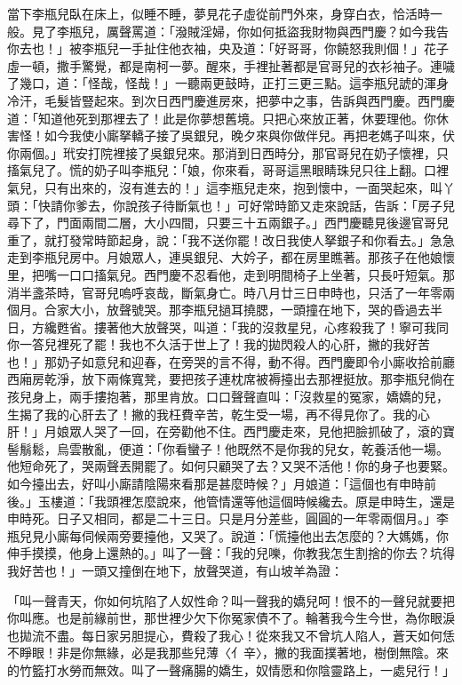 當下李瓶兒臥在床上，似睡不睡，夢見花子虛從前門外來，身穿白衣，恰活時一般。見了李瓶兒，厲聲罵道：「潑賊淫婦，你如何抵盜我財物與西門慶？如今我告你去也！」被李瓶兒一手扯住他衣袖，央及道：「好哥哥，你饒怒我則個！」花子虛一頓，撒手驚覺，都是南柯一夢。醒來，手裡扯著都是官哥兒的衣衫袖子。連噦了幾口，道：「怪哉，怪哉！」一聽兩更鼓時，正打三更三點。這李瓶兒諕的渾身冷汗，毛髮皆豎起來。到次日西門慶進房來，把夢中之事，告訴與西門慶。西門慶道：「知道他死到那裡去了！此是你夢想舊境。只把心來放正著，休要理他。你休害怪！如今我使小廝拏轎子接了吳銀兒，晚夕來與你做伴兒。再把老媽子叫來，伏你兩個。」玳安打院裡接了吳銀兒來。那消到日西時分，那官哥兒在奶子懷裡，只搐氣兒了。慌的奶子叫李瓶兒：「娘，你來看，哥哥這黑眼睛珠兒只往上翻。口裡氣兒，只有出來的，沒有進去的！」這李瓶兒走來，抱到懷中，一面哭起來，叫丫頭：「快請你爹去，你說孩子待斷氣也！」可好常時節又走來說話，告訴：「房子兒尋下了，門面兩間二層，大小四間，只要三十五兩銀子。」西門慶聽見後邊官哥兒重了，就打發常時節起身，說：「我不送你罷！改日我使人拏銀子和你看去。」急急走到李瓶兒房中。月娘眾人，連吳銀兒、大妗子，都在房里瞧著。那孩子在他娘懷里，把嘴一口口搐氣兒。西門慶不忍看他，走到明間椅子上坐著，只長吁短氣。那消半盞茶時，官哥兒嗚呼哀哉，斷氣身亡。時八月廿三日申時也，只活了一年零兩個月。合家大小，放聲號哭。那李瓶兒撾耳撓腮，一頭撞在地下，哭的昏過去半日，方纔甦省。摟著他大放聲哭，叫道：「我的沒救星兒，心疼殺我了！寧可我同你一答兒裡死了罷！我也不久活于世上了！我的拋閃殺人的心肝，撇的我好苦也！」那奶子如意兒和迎春，在旁哭的言不得，動不得。西門慶即令小廝收拾前廳西廂房乾淨，放下兩條寬凳，要把孩子連枕席被褥擡出去那裡挺放。那李瓶兒倘在孩兒身上，兩手摟抱著，那里肯放。口口聲聲直叫：「沒救星的冤家，嬌嬌的兒，生揭了我的心肝去了！撇的我枉費辛苦，乾生受一場，再不得見你了。我的心肝！」月娘眾人哭了一回，在旁勸他不住。西門慶走來，見他把臉抓破了，滾的寶髻鬅鬆，烏雲散亂，便道：「你看蠻子！他既然不是你我的兒女，乾養活他一場。他短命死了，哭兩聲丟開罷了。如何只顧哭了去？又哭不活他！你的身子也要緊。如今擡出去，好叫小廝請陰陽來看那是甚麼時候？」月娘道：「這個也有申時前後。」玉樓道：「我頭裡怎麼說來，他管情還等他這個時候纔去。原是申時生，還是申時死。日子又相同，都是二十三日。只是月分差些，圓圓的一年零兩個月。」李瓶兒見小廝每伺候兩旁要擡他，又哭了。說道：「慌擡他出去怎麼的？大媽媽，你伸手摸摸，他身上還熱的。」叫了一聲：「我的兒嚛，你教我怎生割捨的你去？坑得我好苦也！」一頭又撞倒在地下，放聲哭道，有山坡羊為證：

「叫一聲青天，你如何坑陷了人奴性命？叫一聲我的嬌兒呵！恨不的一聲兒就要把你叫應。也是前緣前世，那世裡少欠下你冤家債不了。輪著我今生今世，為你眼淚也拋流不盡。每日家另胆提心，費殺了我心！從來我又不曾坑人陷人，蒼天如何恁不睜眼！非是你無緣，必是我那些兒薄〈亻辛〉，撇的我面撲著地，樹倒無陰。來的竹籃打水勞而無效。叫了一聲痛腸的嬌生，奴情愿和你陰靈路上，一處兒行！」

